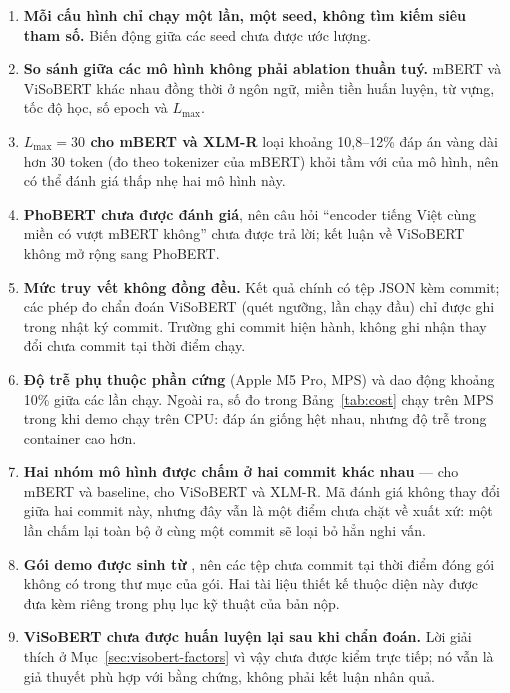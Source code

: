 \begin{enumerate}[resume]
  \item \textbf{Mỗi cấu hình chỉ chạy một lần, một seed, không tìm kiếm siêu tham số.} Biến động
        giữa các seed chưa được ước lượng.
  \item \textbf{So sánh giữa các mô hình không phải ablation thuần tuý.} mBERT và ViSoBERT khác nhau
        đồng thời ở ngôn ngữ, miền tiền huấn luyện, từ vựng, tốc độ học, số epoch và $L_{\max}$.
  \item \textbf{$L_{\max} = 30$ cho mBERT và XLM-R} loại khoảng 10,8--12\% đáp án vàng dài hơn 30
        token (đo theo tokenizer của mBERT) khỏi tầm với của mô hình, nên có thể đánh giá thấp nhẹ
        hai mô hình này.
  \item \textbf{PhoBERT chưa được đánh giá}, nên câu hỏi ``encoder tiếng Việt cùng miền có vượt mBERT
        không'' chưa được trả lời; kết luận về ViSoBERT không mở rộng sang PhoBERT.
  \item \textbf{Mức truy vết không đồng đều.} Kết quả chính có tệp JSON kèm commit; các phép đo chẩn
        đoán ViSoBERT (quét ngưỡng, lần chạy đầu) chỉ được ghi trong nhật ký commit. Trường
         ghi commit hiện hành, không ghi nhận thay đổi chưa commit tại thời điểm chạy.
  \item \textbf{Độ trễ phụ thuộc phần cứng} (Apple M5 Pro, MPS) và dao động khoảng 10\% giữa các lần
        chạy. Ngoài ra, số đo trong Bảng~\ref{tab:cost} chạy trên MPS trong khi demo chạy trên CPU:
        đáp án giống hệt nhau, nhưng độ trễ trong container cao hơn.
  \item \textbf{Hai nhóm mô hình được chấm ở hai commit khác nhau} ---  cho mBERT và
        baseline,  cho ViSoBERT và XLM-R. Mã đánh giá không thay đổi giữa hai commit
        này, nhưng đây vẫn là một điểm chưa chặt về xuất xứ: một lần chấm lại toàn bộ ở cùng một
        commit sẽ loại bỏ hẳn nghi vấn.
  \item \textbf{Gói demo được sinh từ }, nên các tệp chưa commit tại thời
        điểm đóng gói không có trong thư mục  của gói. Hai tài liệu thiết kế thuộc
        diện này được đưa kèm riêng trong phụ lục kỹ thuật của bản nộp.
  \item \textbf{ViSoBERT chưa được huấn luyện lại sau khi chẩn đoán.} Lời giải thích ở
        Mục~\ref{sec:visobert-factors} vì vậy chưa được kiểm trực tiếp; nó vẫn là giả thuyết phù
        hợp với bằng chứng, không phải kết luận nhân quả.
\end{enumerate}

